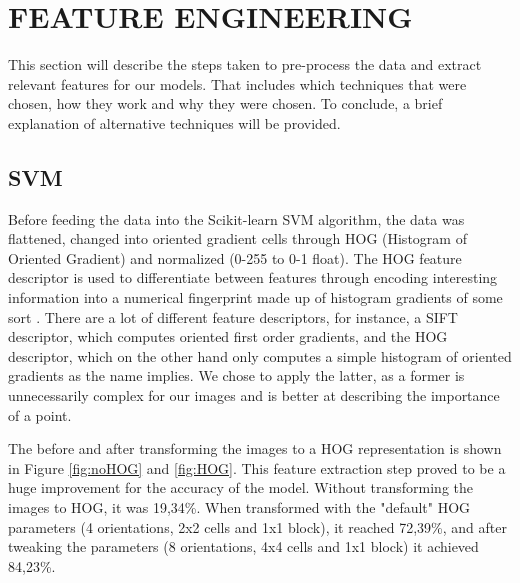 \section{FEATURE ENGINEERING} 
\label{sec:feat-eng}

This section will describe the steps taken to pre-process the data and extract relevant features for our models. That includes which techniques that were chosen, how they work and why they were chosen. To conclude, a brief explanation of alternative techniques will be provided.

\subsection{SVM}

Before feeding the data into the Scikit-learn SVM algorithm, the data was flattened, changed into oriented gradient cells through HOG (Histogram of Oriented Gradient) and normalized (0-255 to 0-1 float). The HOG feature descriptor is used to differentiate between features through encoding interesting information into a numerical fingerprint made up of histogram gradients of some sort \cite{sklearn_api}. There are a lot of different feature descriptors, for instance, a SIFT descriptor, which computes oriented first order gradients, and the HOG descriptor, which on the other hand only computes a simple histogram of oriented gradients as the name implies. We chose to apply the latter, as a former is unnecessarily complex for our images and is better at describing the importance of a point. 

The before and after transforming the images to a HOG representation is shown in Figure \ref{fig:noHOG} and \ref{fig:HOG}. This feature extraction step proved to be a huge improvement for the accuracy of the model. Without transforming the images to HOG, it was 19,34\%. When transformed with the "default" HOG parameters (4 orientations, 2x2 cells and 1x1 block), it reached 72,39\%, and after tweaking the parameters (8 orientations, 4x4 cells and 1x1 block) it achieved  84,23\%. 

